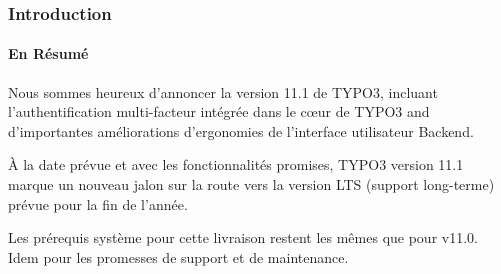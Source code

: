 %

\begin{frame}[fragile]
	\frametitle{Introduction}
	\framesubtitle{En Résumé}

	\small
		Nous sommes heureux d'annoncer la version 11.1 de TYPO3, incluant l'authentification multi-facteur
		intégrée dans le cœur de TYPO3 and d'importantes améliorations d'ergonomies de l'interface utilisateur Backend.

		\vspace{0.2cm}

		À la date prévue et avec les fonctionnalités promises, TYPO3 version 11.1
		marque un nouveau jalon sur la route vers la version LTS (support long-terme)
		prévue pour la fin de l'année.

		\vspace{0.2cm}

		Les prérequis système pour cette livraison restent les mêmes que pour v11.0.
		Idem pour les promesses de support et de maintenance.

	\normalsize

\end{frame}

